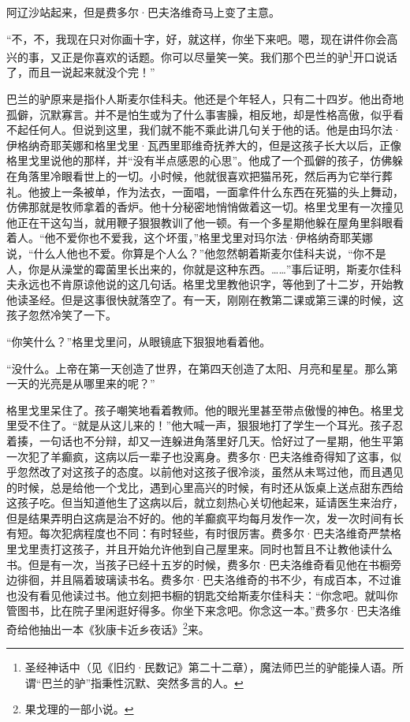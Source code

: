 \par 阿辽沙站起来，但是费多尔·巴夫洛维奇马上变了主意。
\par “不，不，我现在只对你画十字，好，就这样，你坐下来吧。嗯，现在讲件你会高兴的事，又正是你喜欢的话题。你可以尽量笑一笑。我们那个巴兰的驴\footnote{圣经神话中（见《旧约·民数记》第二十二章），魔法师巴兰的驴能操人语。所谓“巴兰的驴”指秉性沉默、突然多言的人。}开口说话了，而且一说起来就没个完！”
\par 巴兰的驴原来是指仆人斯麦尔佳科夫。他还是个年轻人，只有二十四岁。他出奇地孤僻，沉默寡言。并不是怕生或为了什么事害臊，相反地，却是性格高傲，似乎看不起任何人。但说到这里，我们就不能不乘此讲几句关于他的话。他是由玛尔法·伊格纳奇耶芙娜和格里戈里·瓦西里耶维奇抚养大的，但是这孩子长大以后，正像格里戈里说他的那样，并“没有半点感恩的心思”。他成了一个孤僻的孩子，仿佛躲在角落里冷眼看世上的一切。小时候，他就很喜欢把猫吊死，然后再为它举行葬礼。他披上一条被单，作为法衣，一面唱，一面拿件什么东西在死猫的头上舞动，仿佛那就是牧师拿着的香炉。他十分秘密地悄悄做着这一切。格里戈里有一次撞见他正在干这勾当，就用鞭子狠狠教训了他一顿。有一个多星期他躲在屋角里斜眼看着人。“他不爱你也不爱我，这个坏蛋，”格里戈里对玛尔法·伊格纳奇耶芙娜说，“什么人他也不爱。你算是个人么？”他忽然朝着斯麦尔佳科夫说，“你不是人，你是从澡堂的霉菌里长出来的，你就是这种东西。……”事后证明，斯麦尔佳科夫永远也不肯原谅他说的这几句话。格里戈里教他识字，等他到了十二岁，开始教他读圣经。但是这事很快就落空了。有一天，刚刚在教第二课或第三课的时候，这孩子忽然冷笑了一下。
\par “你笑什么？”格里戈里问，从眼镜底下狠狠地看着他。
\par “没什么。上帝在第一天创造了世界，在第四天创造了太阳、月亮和星星。那么第一天的光亮是从哪里来的呢？”
\par 格里戈里呆住了。孩子嘲笑地看着教师。他的眼光里甚至带点傲慢的神色。格里戈里受不住了。“就是从这儿来的！”他大喊一声，狠狠地打了学生一个耳光。孩子忍着揍，一句话也不分辩，却又一连躲进角落里好几天。恰好过了一星期，他生平第一次犯了羊癫疯，这病以后一辈子也没离身。费多尔·巴夫洛维奇得知了这事，似乎忽然改了对这孩子的态度。以前他对这孩子很冷淡，虽然从未骂过他，而且遇见的时候，总是给他一个戈比，遇到心里高兴的时候，有时还从饭桌上送点甜东西给这孩子吃。但当知道他生了这病以后，就立刻热心关切他起来，延请医生来治疗，但是结果弄明白这病是治不好的。他的羊癫疯平均每月发作一次，发一次时间有长有短。每次犯病程度也不同：有时轻些，有时很厉害。费多尔·巴夫洛维奇严禁格里戈里责打这孩子，并且开始允许他到自己屋里来。同时也暂且不让教他读什么书。但是有一次，当孩子已经十五岁的时候，费多尔·巴夫洛维奇看见他在书橱旁边徘徊，并且隔着玻璃读书名。费多尔·巴夫洛维奇的书不少，有成百本，不过谁也没有看见他读过书。他立刻把书橱的钥匙交给斯麦尔佳科夫：“你念吧。就叫你管图书，比在院子里闲逛好得多。你坐下来念吧。你念这一本。”费多尔·巴夫洛维奇给他抽出一本《狄康卡近乡夜话》\footnote{果戈理的一部小说。}来。
